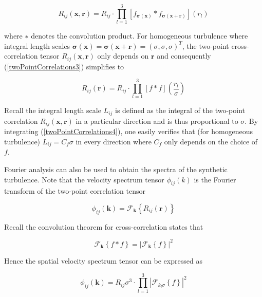 \begin{equation} \label{twoPointCorrelations3}
R_{ij}(\boldsymbol{x},\boldsymbol{r}) = R_{ij} \cdot \prod_{l=1}^3 \left[f_{\boldsymbol{\sigma}(\boldsymbol{x})} *f_{\boldsymbol{\sigma}(\boldsymbol{x}+\boldsymbol{r})} \right](r_l)
\end{equation}

\noindent where $∗$ denotes the convolution product. For homogeneous turbulence where integral length scales $\boldsymbol{\sigma}(\boldsymbol{x}) = \boldsymbol{\sigma}(\boldsymbol{x}+\boldsymbol{r}) =(\sigma,\sigma,\sigma)^T$, the two-point cross-correlation tensor $R_{ij}(\boldsymbol{x},\boldsymbol{r})$ only depends on $\boldsymbol{r}$ and consequently (\ref{twoPointCorrelations3}) simplifies to 

\begin{equation} \label{twoPointCorrelations4}
R_{ij}(\boldsymbol{r}) = R_{ij} \cdot \prod_{l=1}^3 \left[f*f\right]\left(\frac{r_l}{\sigma}\right)
\end{equation}

\noindent Recall the integral length scale $L_{ij}$ is defined as the integral of the two-point correlation $R_{ij}(\boldsymbol{x},\boldsymbol{r})$ in a particular direction and is thus proportional to $\sigma$. By integrating (\ref{twoPointCorrelations4}), one easily verifies that (for homogeneous turbulence) $L_{ij}=C_f\sigma$ in every direction where $C_f$ only depends on the choice of $f$. 

Fourier analysis can also be used to obtain the spectra of the synthetic turbulence. Note that the velocity spectrum tensor $\phi_{ij}(k)$ is the Fourier transform of the two-point correlation tensor 

\begin{equation}
\phi_{ij}(\boldsymbol{k}) = \mathcal{F}_{\boldsymbol{k}}\left\{R_{ij}(\boldsymbol{r})\right\}
\end{equation}

\noindent Recall the convolution theorem for cross-correlation states that 

\begin{equation}
\mathcal{F}_{\boldsymbol{k}}\left\{f * f\right\} = |\mathcal{F}_{\boldsymbol{k}}\left\{f\right\}|^2
\end{equation}

\noindent Hence the spatial velocity spectrum tensor can be expressed as

\begin{equation}
\phi_{ij}(\boldsymbol{k}) = R_{ij}\sigma^3 \cdot \prod_{l=1}^3|\mathcal{F}_{k_l\sigma}\left\{f\right\}|^2
\end{equation}

